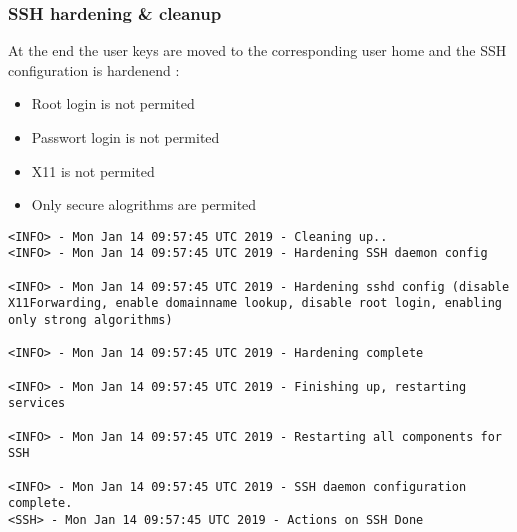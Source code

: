 \subsubsection{SSH hardening \& cleanup}
At the end the user keys are moved to the corresponding user home and the SSH configuration is hardenend \cite{ssh-hardening}:
\begin{itemize}
\item Root login is not permited
\item Passwort login is not permited
\item X11 is not permited
\item Only secure alogrithms are permited
\end{itemize}
\begin{lstlisting}[escapeinside=||]
<INFO> - Mon Jan 14 09:57:45 UTC 2019 - Cleaning up..
<INFO> - Mon Jan 14 09:57:45 UTC 2019 - Hardening SSH daemon config
                                                                                                                                                                                                                                                                                                                                              
<INFO> - Mon Jan 14 09:57:45 UTC 2019 - Hardening sshd config (disable X11Forwarding, enable domainname lookup, disable root login, enabling only strong algorithms)

<INFO> - Mon Jan 14 09:57:45 UTC 2019 - Hardening complete
                                                                                                                                                                                                                                                                                                                                              
<INFO> - Mon Jan 14 09:57:45 UTC 2019 - Finishing up, restarting services
                                                                                                                                                                                                                                                                                                                                              
<INFO> - Mon Jan 14 09:57:45 UTC 2019 - Restarting all components for SSH
                                                                                                                                                                                                                                                                                                                                              
<INFO> - Mon Jan 14 09:57:45 UTC 2019 - SSH daemon configuration complete.
<SSH> - Mon Jan 14 09:57:45 UTC 2019 - Actions on SSH Done
 \end{lstlisting}

